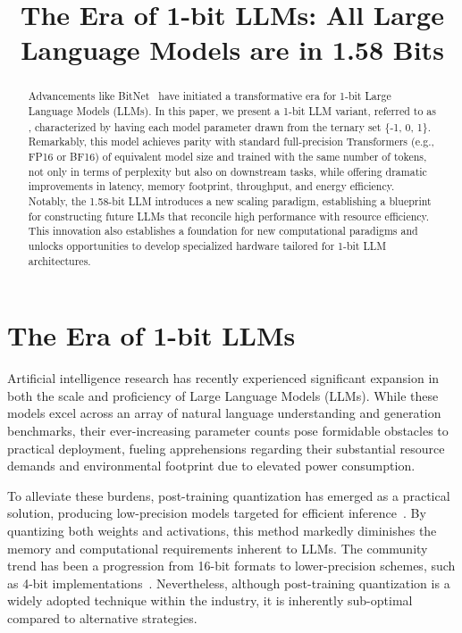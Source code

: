 \title{The Era of 1-bit LLMs: All Large Language Models are in 1.58 Bits}

\begin{abstract}
Advancements like BitNet~\cite{bitnet} have initiated a transformative era for 1-bit Large Language Models (LLMs). In this paper, we present a 1-bit LLM variant, referred to as \textbf{}, characterized by having each model parameter drawn from the ternary set \{-1, 0, 1\}. Remarkably, this model achieves parity with standard full-precision Transformers (e.g., FP16 or BF16) of equivalent model size and trained with the same number of tokens, not only in terms of perplexity but also on downstream tasks, while offering dramatic improvements in latency, memory footprint, throughput, and energy efficiency. Notably, the 1.58-bit LLM introduces a new scaling paradigm, establishing a blueprint for constructing future LLMs that reconcile high performance with resource efficiency. This innovation also establishes a foundation for new computational paradigms and unlocks opportunities to develop specialized hardware tailored for 1-bit LLM architectures.
\end{abstract}

\section{The Era of 1-bit LLMs}

Artificial intelligence research has recently experienced significant expansion in both the scale and proficiency of Large Language Models (LLMs). While these models excel across an array of natural language understanding and generation benchmarks, their ever-increasing parameter counts pose formidable obstacles to practical deployment, fueling apprehensions regarding their substantial resource demands and environmental footprint due to elevated power consumption.

To alleviate these burdens, post-training quantization has emerged as a practical solution, producing low-precision models targeted for efficient inference~\cite{smoothquant, gptq, quip, quip_sharp}. By quantizing both weights and activations, this method markedly diminishes the memory and computational requirements inherent to LLMs. The community trend has been a progression from 16-bit formats to lower-precision schemes, such as 4-bit implementations~\cite{gptq, awq}. Nevertheless, although post-training quantization is a widely adopted technique within the industry, it is inherently sub-optimal compared to alternative strategies.

